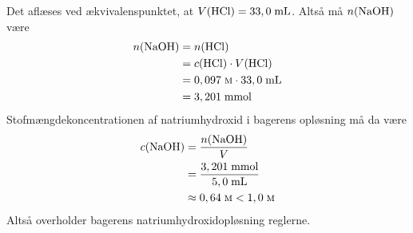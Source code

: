 \documentclass{report}
\begin{document}
Det aflæses ved ækvivalenspunktet, at $V(\ce{HCl} )=33,0 \;\unit{mL} $.
Altså må $n(\ce{NaOH} )$ være 
\begin{equation*}
\begin{split}
  n(\ce{NaOH} )&=n(\ce{HCl} )\\
  &=c(\ce{HCl} ) \cdot V(\ce{HCl} )\\
  &=0,097 \;\unit{\textsc{m}} \cdot 33,0 \;\unit{mL} \\
  &=3,201 \;\unit{mmol} 
\end{split}
\end{equation*}
Stofmængdekoncentrationen af natriumhydroxid i bagerens opløsning må da være
\begin{equation*}
\begin{split}
  c(\ce{NaOH} )&=\frac{n(\ce{NaOH} )}{V}\\
  &=\frac{3,201 \;\unit{mmol}}{5,0 \;\unit{mL} }\\
  &\approx 0,64 \;\unit{\textsc{m}}  < 1,0 \;\unit{\textsc{m}}  
\end{split}
\end{equation*}
Altså overholder bagerens natriumhydroxidopløsning reglerne.
\end{document}
